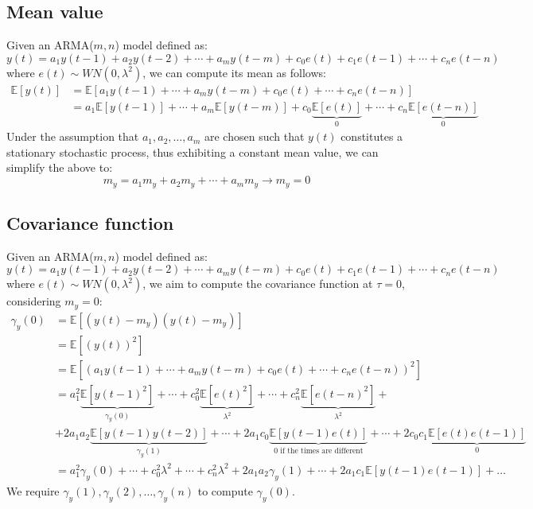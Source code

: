 \subsection{Mean value}
Given an ARMA($m,n$) model defined as:
\[y(t)=a_1y(t-1)+a_2y(t-2)+\cdots+a_m y(t-m)+c_0e(t)+c_1e(t-1)+\cdots+c_n e(t-n)\]
where $e(t)\sim WN(0,\lambda^2)$, we can compute its mean as follows:
\begin{align*}
    \mathbb{E}\left[y(t)\right] &= \mathbb{E}\left[a_1y(t-1)+\cdots+a_m y(t-m)+c_0e(t)+\cdots+c_n e(t-n)\right] \\
                                &= a_1\mathbb{E}\left[y(t-1)\right]+\cdots+a_m\mathbb{E}\left[y(t-m)\right] +c_0\underbrace{\mathbb{E}\left[e(t)\right]}_0 +\cdots+c_n\underbrace{\mathbb{E}\left[e(t-n)\right]}_0
\end{align*}
Under the assumption that $a_1,a_2,\dots,a_m$ are chosen such that $y(t)$ constitutes a stationary stochastic process, thus exhibiting a constant mean value, we can simplify the above to:
\[m_y=a_1m_y+a_2m_y+\cdots+a_m m_y \rightarrow m_y=0\]

\subsection{Covariance function}
Given an ARMA($m,n$) model defined as:
\[y(t)=a_1y(t-1)+a_2y(t-2)+\cdots+a_m y(t-m)+c_0e(t)+c_1e(t-1)+\cdots+c_n e(t-n)\]
where $e(t)\sim WN(0,\lambda^2)$, we aim to compute the covariance function at $\tau=0$, considering $m_y=0$:
\begin{align*}
    \gamma_y(0) &=\mathbb{E}\left[ \left(y(t)-m_y\right)\left(y(t)-m_y\right) \right] \\
                &=\mathbb{E}\left[ {\left(y(t)\right)}^2 \right] \\
                &=\mathbb{E}\left[ {\left(a_1y(t-1)+\cdots+a_m y(t-m)+c_0e(t)+\cdots+c_n e(t-n)\right)}^2 \right] \\      
                &=a_1^2\underbrace{\mathbb{E}\left[ {y(t-1)}^2 \right]}_{\gamma_y(0)} +\cdots+c_0^2\underbrace{\mathbb{E}\left[ {e(t)}^2 \right]}_{\lambda^2} +\cdots+c_n^2 \underbrace{\mathbb{E}\left[ {e(t-n)}^2 \right]}_{\lambda^2}  +\\
                &+ 2a_1a_2\underbrace{\mathbb{E}\left[ y(t-1)y(t-2) \right]}_{\gamma_y(1)}  + \cdots + 2a_1c_0\underbrace{\mathbb{E}\left[ y(t-1)e(t) \right]}_{0 \text{ if the times are different}}  + \cdots + 2c_0c_1\underbrace{\mathbb{E}\left[ e(t)e(t-1) \right]}_0  \\   
                &=a_1^2\gamma_y(0) +\cdots+c_0^2\lambda^2 +\cdots+c_n^2 \lambda^2  + 2a_1a_2\gamma_y(1)  + \cdots + 2a_1c_1\mathbb{E}\left[ y(t-1)e(t-1) \right]+\dots    
\end{align*}
We require $\gamma_y(1),\gamma_y(2),\dots,\gamma_y(n)$ to compute $\gamma_y(0)$.

